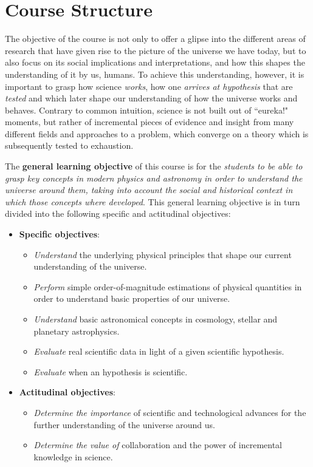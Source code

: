 \documentclass{tufte-handout}
\begin{document}
\section{Course Structure}\label{sec:structure}
\begin{fullwidth}
The objective of the course is not only to offer a glipse into the different areas of research that have given rise to the picture 
of the universe we have today, but to also focus on its social implications and interpretations, and how this shapes the understanding 
of it by us, humans. To achieve this understanding, however, it is important to grasp how science \textit{works}, how 
one \textit{arrives at hypothesis} that are \textit{tested} and which later shape our understanding of how the universe works and 
behaves. Contrary to common intuition, science is not built out of ``eureka!" moments, but rather of incremental pieces of evidence 
and insight from many different fields and approaches to a problem, which converge on a theory which is subsequently tested to exhaustion.

The \textbf{general learning objective} of this course is for the \textit{students to be able to grasp key concepts in modern physics and 
astronomy in order to understand the universe around them, taking into account the social and historical context in which those concepts 
where developed}. This general learning objective is in turn divided into the following specific and actitudinal objectives:
\begin{itemize}
\item \textbf{Specific objectives}:
\begin{itemize}
\item \textit{Understand} the underlying physical principles that shape our current understanding of the universe. 
\item \textit{Perform} simple order-of-magnitude estimations of physical quantities in order to understand basic properties of our universe.
\item \textit{Understand} basic astronomical concepts in cosmology, stellar and planetary astrophysics. 
\item \textit{Evaluate} real scientific data in light of a given scientific hypothesis.
\item \textit{Evaluate} when an hypothesis is scientific.
\end{itemize}
\item \textbf{Actitudinal objectives}:
\begin{itemize}
\item \textit{Determine the importance} of scientific and technological advances for the further understanding of the universe around us.
\item \textit{Determine the value of} collaboration and the power of incremental knowledge in science.
\end{itemize}
\end{itemize}


\end{fullwidth}
\end{document}
